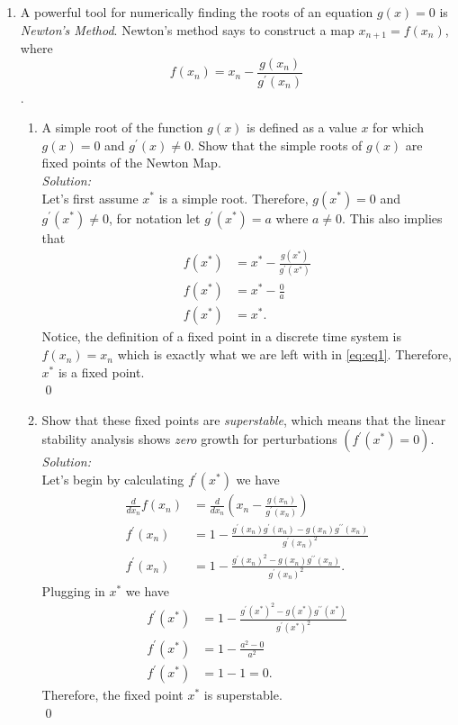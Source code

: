 \documentclass[10pt]{amsart}
\theoremstyle{nonumberplain}
\begin{document}
\begin{enumerate}[label={\bf {\arabic*}:}]
\item A powerful tool for numerically finding the roots of an equation $g(x) = 0$ is \textit{Newton's Method}.
Newton's method says to construct a map $x_{n + 1} = f(x_n)$, where 
$$
f(x_n) = x_n - \frac{g(x_n)}{g^\prime(x_n)}
$$. 
\begin{enumerate}

\item A simple root of the function $g(x)$ is defined as a value $x$ for which $g(x) = 0$ and $g^\prime(x) \neq 0$.
Show that the simple roots of $g(x)$ are fixed points of the Newton Map. \\

\textit{Solution:} \\
Let's first assume $x^*$ is a simple root.
Therefore, $g(x^*) = 0$ and $g^\prime(x^*) \neq 0$, for notation let $g^\prime(x^*) = a$ where $a \neq 0$.
This also implies that 
\begin{align}
f(x^*) &= x^* - \frac{g(x^*)}{g^\prime(x^*)} \nonumber \\
f(x^*) &= x^* - \frac 0 a \nonumber \\
f(x^*) &= x^*.
\label{eq:eq1}
\end{align}
Notice, the definition of a fixed point in a discrete time system is $f(x_n) = x_n$ which is exactly what we are left with in \eqref{eq:eq1}.
Therefore, $x^*$ is a fixed point. \\
\qed \\

\item Show that these fixed points are \textit{superstable}, which means that the linear stability analysis shows \textit{zero} growth for perturbations $(f^\prime(x^*) = 0).$ \\

\textit{Solution:} \\
Let's begin by calculating $f^\prime(x^*)$ we have
\begin{align*}
\frac {d}{d x_n} f(x_n) &= \frac {d}{d x_n} \left( x_n - \frac{g(x_n)}{g^\prime(x_n)} \right) \\
f^\prime(x_n) &= 1 - \frac{g^\prime(x_n)g^\prime(x_n) - g(x_n)g^{\prime\prime}(x_n)}{g^\prime(x_n)^2} \\
f^\prime(x_n) &= 1 - \frac{g^\prime(x_n)^2 - g(x_n)g^{\prime\prime}(x_n)}{g^\prime(x_n)^2}.
\end{align*}
Plugging in $x^*$ we have
\begin{align*}
f^\prime(x^*) &= 1 - \frac{g^\prime(x^*)^2 - g(x^*)g^{\prime\prime}(x^*)}{g^\prime(x^*)^2} \\
f^\prime(x^*) &= 1 - \frac{a^2 - 0}{a^2} \\
f^\prime(x^*) &= 1 - 1 = 0.
\end{align*}
Therefore, the fixed point $x^*$ is superstable. \\
\qed \\
\newpage


\end{enumerate}
\end{enumerate}
\end{document}
